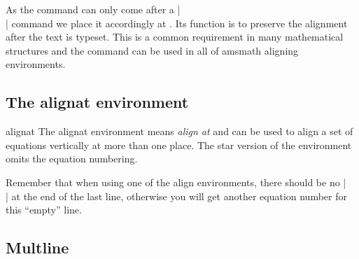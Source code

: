 As the command  can only come after a |\\|  command we place it accordingly at . Its function is to preserve the alignment after the text is typeset. This is a common requirement in many mathematical 
structures and the command can be used in all of amsmath aligning environments.







\subsection{The alignat environment}

\begin{docEnvironment}{alignat}{}
The alignat environment means \emph{align at} and can be used to align a set of equations vertically at more than one place. The star version of the environment omits the equation numbering.
\end{docEnvironment}


%



Remember that when using one of the align environments, there should be no |\\| at the end of the
last line, otherwise you will get another equation number for this ``empty''  line.


\subsection{Multline}

